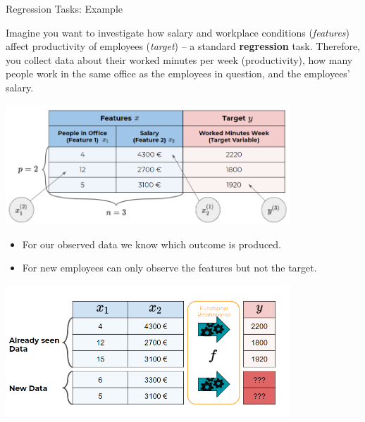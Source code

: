 \documentclass[11pt,compress,t,notes=noshow, xcolor=table]{beamer}
\begin{document}
\begin{vbframe}{Regression Tasks: Example}

Imagine you want to investigate how salary and workplace conditions 
(\emph{features}) affect productivity of employees (\emph{target}) -- a standard 
\textbf{regression} task. Therefore, you collect data about their worked minutes 
per week (productivity), how many people work in the same office as the 
employees in question, and the employees' salary.
  
\begin{center}
  \includegraphics[width = 0.8\textwidth]{figure_man/data_table} 
\end{center}

\framebreak

\begin{itemize}

  \item For our observed data we know which outcome is produced.
  
  \item For new employees can only observe the features but not the target.

\end{itemize}

\begin{center}
  \includegraphics[width=0.8\textwidth]{figure_man/what_is_a_model_web} 
\end{center}

\end{vbframe}
\end{document}
